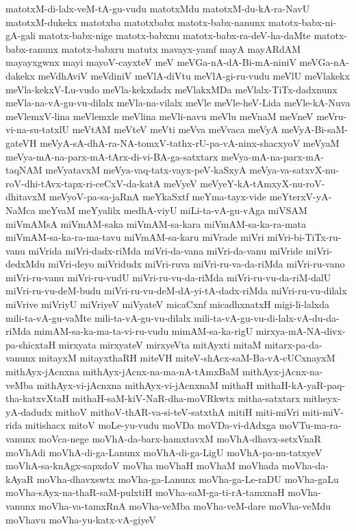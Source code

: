{matotxM-di-lalx-veM-tA-gu-vudu
matotxMdu
matotxM-du-kA-ra-NavU
matotxM-dukekx
matotxba
matotxbabx
matotx-babx-nanunx
matotx-babx-ni-gA-gali
matotx-babx-nige
matotx-babxnu
matotx-babx-ra-deV-ha-daMte
matotx-babx-ranunx
matotx-babxru
matutx
mavayx-yamf
mayA
mayARdAM
mayayxgwnx
mayi
mayoV-cayxteV
meV
meVGa-nA-dA-Bi-mA-niniV
meVGa-nA-dakekx
meVdhAviV
meVdiniV
meVlA-diVtu
meVlA-gi-ru-vudu
meVlU
meVlakekx
meVla-kekxV-Lu-vudo
meVla-kekxdadx
meVlakxMDa
meVlalx-TiTx-dadxnunx
meVla-na-vA-gu-vu-dilalx
meVla-na-vilalx
meVle
meVle-heV-Lida
meVle-kA-Nuva
meVlemxV-lina
meVlemxle
meVlina
meVli-navu
meVlu
meVnaM
meVneV
meVru-vi-na-su-tatxlU
meVtAM
meVteV
meVti
meVva
meVvaca
meVyA
meVyA-Bi-saM-gateVH
meVyA-sA-dhA-ra-NA-tomxV-tathx-rU-pa-vA-ninx-shacxyoV
meVyaM
meVya-mA-na-parx-mA-tArx-di-vi-BA-ga-satxtarx
meVya-mA-na-parx-mA-taqNAM
meVyatavxM
meVya-vaq-tatx-vayx-peV-kaSxyA
meVya-va-satxvX-nu-roV-dhi-tAvx-tapx-ri-ceCxV-da-katA
meVyeV
meVyeY-kA-tAmxyX-nu-roV-dhitavxM
meVyoV-pa-sa-jaRnA
meYkaSxtf
meYma-tayx-vide
meYterxV-yA-NaMca
meYvaM
meYyalilx
medhA-viyU
miLi-ta-vA-gu-vAga
miVSAM
miVmAMsA
miVmAM-saka
miVmAM-sa-kara
miVmAM-sa-ka-ra-mata
miVmAM-sa-ka-ra-ma-tavu
miVmAM-sa-karu
miVrade
miVri
miVri-bi-TiTx-ru-vanu
miVrida
miVri-dadx-riMda
miVri-da-vana
miVri-da-vanu
miVride
miVri-dedxMdu
miVri-deyo
miVridudx
miVri-ruva
miVri-ru-va-da-riMda
miVri-ru-vano
miVri-ru-vanu
miVri-ru-vudU
miVri-ru-vu-da-riMda
miVri-ru-vu-da-riM-dalU
miVri-ru-vu-deM-budu
miVri-ru-vu-deM-dA-yi-tA-dadx-riMda
miVri-ru-vu-dilalx
miVrive
miVriyU
miVriyeV
miVyateV
micaCxnf
micadhxnatxH
migi-li-lalxda
mili-ta-vA-gu-vaMte
mili-ta-vA-gu-vu-dilalx
mili-ta-vA-gu-vu-di-lalx-vA-du-da-riMda
mimAM-sa-ka-ma-ta-vi-ru-vudu
mimAM-sa-ka-rigU
mirxya-mA-NA-divx-pa-shicxtaH
mirxyata
mirxyateV
mirxyeVta
mitAyxti
mitaM
mitarx-pa-da-vanunx
mitayxM
mitayxthaRH
miteVH
miteV-shAcx-saM-Ba-vA-cUCxnayxM
mithAyx-jAcnxna
mithAyx-jAcnx-na-ma-nA-tAmxBaM
mithAyx-jAcnx-na-veMba
mithAyx-vi-jAcnxna
mithAyx-vi-jAcnxnaM
mithaH
mithaH-kA-yaR-paq-tha-katxvXtaH
mithaH-saM-kiV-NaR-dha-moVRkwtx
mitha-satxtarx
mitheyx-yA-dadudx
mithoV
mithoV-thAR-va-si-teV-satxthA
mitiH
miti-miVri
miti-miV-rida
mitishacx
mitoV
moLe-yu-vudu
moVDa
moVDa-vi-dAdxga
moVTu-ma-ra-vanunx
moVca-nege
moVhA-da-barx-hamxtavxM
moVhA-dhavx-setxVnaR
moVhAdi
moVhA-di-ga-Lanunx
moVhA-di-ga-LigU
moVhA-pa-nu-tatxyeV
moVhA-sa-knAgx-sapxdoV
moVha
moVhaH
moVhaM
moVhada
moVha-da-kAyaR
moVha-dhavxswtx
moVha-ga-Lanunx
moVha-ga-Le-raDU
moVha-gaLu
moVha-sAyx-na-thaR-saM-pulxtiH
moVha-saM-ga-ti-rA-tamxnaH
moVha-vanunx
moVha-va-tamxRnA
moVha-veMba
moVha-veM-dare
moVha-veMdu
moVhavu
moVha-yu-katx-vA-giyeV
}
